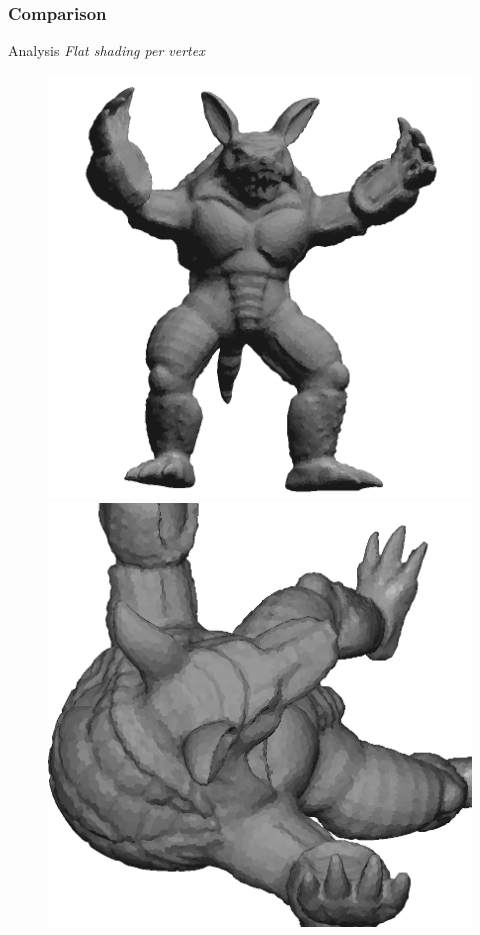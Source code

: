 \subsubsection{Comparison}
\color{red}{TODO: add armadillo, horse, etc. images with these 3 effects (flat shading 1 and 2, gouraud shading)}
\color{black} %
Analysis \textit{Flat shading per vertex}
\begin{figure}[h]
    \centering
    \centering
    \includegraphics[scale=0.3]{images/armadillo-extendfs.png}
    \endminipage\hfill
    \centering
    \includegraphics[scale=0.3]{images/armadillo-extendfs-1.png}

\end{figure}
